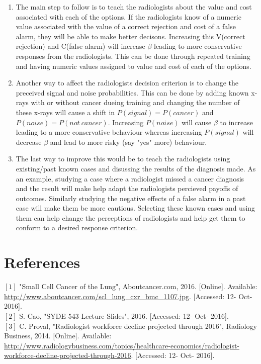 \documentclass[12pt]{article}
\begin{document}
	\begin{enumerate}
		\item The main step to follow is to teach the radiologists about the value and cost associated with each of the options. If the radiologists know of a numeric value associated with the value of a correct rejection and cost of a false alarm, they will be able to make better decisons. Increasing this V(correct rejection) and C(false alarm) will increase $\beta$ leading to more conservative responses from the radiologists. This can be done through repeated training and having numeric values assigned to value and cost of each of the options.
		\item Another way to affect the radiologists decision criterion is to change the preceived signal and noise probabilities. This can be done by adding known x-rays with or without cancer dueing training and changing the number of these x-rays will cause a shift in $P(signal)=P(cancer)$ and $P(noise)=P(not\ cancer)$. Increasing $P(noise)$ will cause $\beta$ to increase leading to a more conservative behaviour whereas increasing $P(signal)$ will decrease $\beta$ and lead to more risky (say "yes" more) behaviour.
		\item The last way to improve this would be to teach the radiologists using existing/past known cases and disussing the results of the diagnosis made. As an example, studying a case where a radiologist missed a cancer diagnosis and the result will make help adapt the radiologists percieved payoffs of outcomes. Similarly studying the negative effects of a false alarm in a past case will make them be more cautious. Selecting these known cases and using them can help change the perceptions of radiologists and help get them to conform to a desired response criterion.
	\end{enumerate}
	
	\section{References}
	$[1]$ "Small Cell Cancer of the Lung", Aboutcancer.com, 2016. [Online]. Available: \url{http://www.aboutcancer.com/scl_lung_cxr_bmc_1107.jpg}. [Accessed: 12- Oct- 2016]. \\
	$[2]$ S.  Cao, "SYDE 543 Lecture Slides", 2016. [Accessed: 12- Oct- 2016].\\
	$[3]$ C.  Proval, "Radiologist workforce decline projected through 2016", Radiology Business, 2014. [Online]. Available: \url{http://www.radiologybusiness.com/topics/healthcare-economics/radiologist-workforce-decline-projected-through-2016}. [Accessed: 12- Oct- 2016].
	
	
\end{document}
